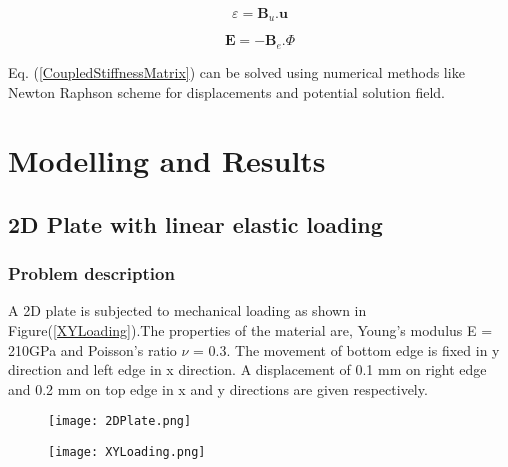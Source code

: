 \documentclass[11pt]{article}
\begin{document}
\begin{equation}
\varepsilon = \textbf{B}_u . \textbf{u}
\end{equation}

\begin{equation}
\textbf{E} = - \textbf{B}_e . \Phi
\end{equation}

\noindent
Eq. (\ref{CoupledStiffnessMatrix}) can be solved using numerical methods like
Newton Raphson scheme for displacements and potential solution field.

\section{Modelling and Results}
\subsection{2D Plate with linear elastic loading}
\subsubsection{Problem description}
A 2D plate is subjected to mechanical loading as shown in Figure(\ref{XYLoading}).The properties of the material are, Young’s modulus E = 210GPa and Poisson's ratio $\nu$ = 0.3.
The movement of bottom edge is fixed in y direction and left edge in x direction. A displacement of 0.1 mm on right edge and 0.2 mm on top edge in x and y directions are given respectively.
\begin{figure}[H]
	\centering
	\begin{minipage}{.5\textwidth}
		\centering
		\texttt{[image: 2DPlate.png]}
		\label{2Dplate}
	\end{minipage}%
	\begin{minipage}{.5\textwidth}
		\centering
		\texttt{[image: XYLoading.png]}
		\label{Loading}
	\end{minipage}
\end{figure}
\end{document}
